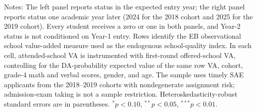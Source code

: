 \begin{table}[!htbp]
\begin{threeparttable}
\begin{tablenotes}[flushleft]
\item Notes: The left panel reports status in the expected entry year; the right panel reports status one academic year later (2024 for the 2018 cohort and 2025 for the 2019 cohort). Every student receives a zero or one in both panels, and Year-2 status is not conditioned on Year-1 entry. Rows identify the EB observational school value-added measure used as the endogenous school-quality index. In each cell, attended-school VA is instrumented with first-round offered-school VA, controlling for the DA-probability expected value of the same row VA, cohort, grade-4 math and verbal scores, gender, and age. The sample uses timely SAE applicants from the 2018--2019 cohorts with nondegenerate assignment risk; admission-exam taking is not a sample restriction. Heteroskedasticity-robust standard errors are in parentheses. $^{*}p<0.10$, $^{**}p<0.05$, $^{***}p<0.01$.
\end{tablenotes}
\end{threeparttable}
\end{table}
